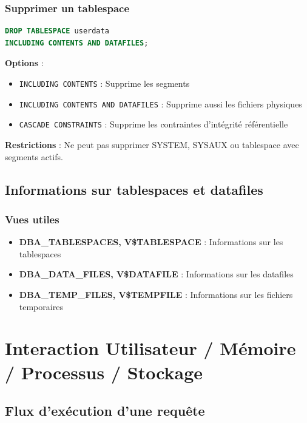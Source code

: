 \documentclass[12pt,a4paper]{article}
\begin{document}
\subsubsection{Supprimer un tablespace}

\begin{lstlisting}[language=SQL]
DROP TABLESPACE userdata 
INCLUDING CONTENTS AND DATAFILES;
\end{lstlisting}

\textbf{Options} :
\begin{itemize}
    \item \texttt{INCLUDING CONTENTS} : Supprime les segments
    \item \texttt{INCLUDING CONTENTS AND DATAFILES} : Supprime aussi les fichiers physiques
    \item \texttt{CASCADE CONSTRAINTS} : Supprime les contraintes d'intégrité référentielle
\end{itemize}

\textbf{Restrictions} : Ne peut pas supprimer SYSTEM, SYSAUX ou tablespace avec segments actifs.

\subsection{Informations sur tablespaces et datafiles}

\subsubsection{Vues utiles}

\begin{itemize}
    \item \textbf{DBA\_TABLESPACES, V\$TABLESPACE} : Informations sur les tablespaces
    \item \textbf{DBA\_DATA\_FILES, V\$DATAFILE} : Informations sur les datafiles
    \item \textbf{DBA\_TEMP\_FILES, V\$TEMPFILE} : Informations sur les fichiers temporaires
\end{itemize}

\section{Interaction Utilisateur / Mémoire / Processus / Stockage}

\subsection{Flux d'exécution d'une requête}
\end{document}
